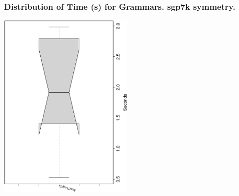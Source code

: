  \begin{frame}
 \frametitle{ Distribution of Time (s) for Grammars. sgp7k  symmetry. }
 \begin{center}
\includegraphics[width=0.5\textwidth, angle=-90]
{ExpFboxplottSeconds005.eps}
 \end{center}
 \label{ExpFboxplottSeconds005.eps}  
 \end{frame}

